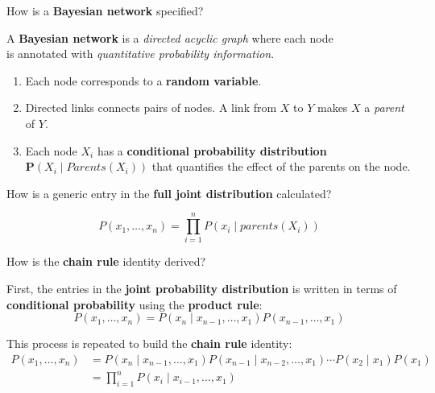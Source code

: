 
\begin{flashcard}[Question]{How is a \textbf{Bayesian network} specified?}
\begin{center}

A \textbf{Bayesian network} is a \textit{directed acyclic graph} where each node\\is annotated with \textit{quantitative probability information}.
\begin{enumerate}[label=\arabic*.]
\item Each node corresponds to a \textbf{random variable}.
\item Directed links connects pairs of nodes. A link from $X$ to $Y$ makes $X$ a \textit{parent} of $Y$.
\item Each node $X_i$ has a \textbf{conditional probability distribution}\\$\mathbf{P}(X_i\mid\textit{Parents}(X_i))$ that quantifies the effect of the parents on the node.
\end{enumerate}

\end{center}
\end{flashcard}

\begin{flashcard}[Question]{How is a generic entry in the \textbf{full joint distribution} calculated?}
\begin{center}

\begin{displaymath}
P(x_1, \ldots, x_n) = \prod_{i = 1}^{n} P(x_i\mid{}\textit{parents}(X_i))
\end{displaymath}

\end{center}
\end{flashcard}

\begin{flashcard}[Question]{How is the \textbf{chain rule} identity derived?}
\begin{center}

First, the entries in the \textbf{joint probability distribution} is written in terms of \textbf{conditional probability} using the \textbf{product rule}:
\begin{displaymath}
P(x_1, \ldots, x_n) = P(x_n \mid x_{n - 1}, \ldots, x_1) P(x_{n - 1}, \ldots, x_1)
\end{displaymath}

This process is repeated to build the \textbf{chain rule} identity:
{\begin{align*}
P(x_1, \ldots, x_n)
&= P(x_n \mid x_{n - 1}, \ldots, x_1) P(x_{n - 1} \mid x_{n - 2}, \ldots, x_1) \cdots P(x_2 \mid x_1) P(x_1)\\
&= \prod_{i = 1}^n P(x_i \mid x_{i - 1}, \ldots, x_1)
\end{align*}}

\end{center}
\end{flashcard}

